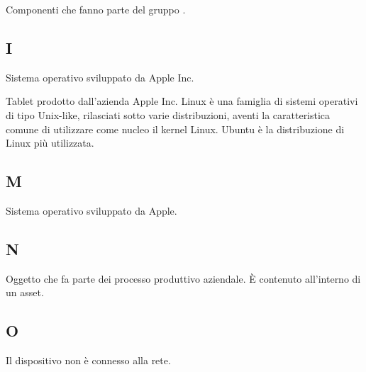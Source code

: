 		Componenti che fanno parte del gruppo \zephyrus.
	\subsection{I}
		Sistema operativo sviluppato da Apple Inc.
	
		Tablet prodotto dall'azienda Apple Inc.
		Linux è una famiglia di sistemi operativi di tipo Unix-like, rilasciati sotto varie distribuzioni, aventi la caratteristica comune di utilizzare come nucleo il kernel Linux. Ubuntu è la distribuzione di Linux più utilizzata.
	\subsection{M}
		Sistema operativo sviluppato da Apple.
	\subsection{N}
		Oggetto che fa parte dei processo produttivo aziendale. È contenuto all'interno di un asset.
	\subsection{O}
		Il dispositivo non è connesso alla rete.
		

